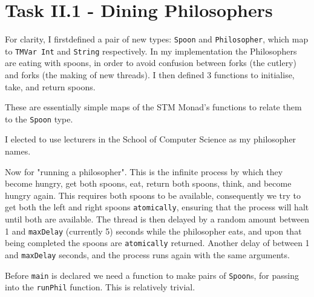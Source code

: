 \documentclass[12pt]{article}
\begin{document}
\maketitle
\tableofcontents

\section{Task II.1 - Dining Philosophers}



For clarity, I firstdefined a pair of new types: \verb|Spoon| and \verb|Philosopher|, which map to \verb|TMVar Int| and \verb|String| respectively.
In my implementation the Philosophers are eating with spoons, in order to avoid confusion between forks (the cutlery) and forks (the making of new threads).
I then defined 3 functions to initialise, take, and return spoons.



These are essentially simple maps of the STM Monad's functions to relate them to the \verb|Spoon| type.



I elected to use lecturers in the School of Computer Science as my philosopher names.



Now for "running a philosopher".
This is the infinite process by which they become hungry, get both spoons, eat, return both spoons, think, and become hungry again.
This requires both spoons to be available, consequently we try to get both the left and right spoons \verb|atomically|, ensuring that the process will halt until both are available.
The thread is then delayed by a random amount between 1 and \verb|maxDelay| (currently 5) seconds while the philosopher eats, and upon that being completed the spoons are \verb|atomically| returned.
Another delay of between 1 and \verb|maxDelay| seconds, and the process runs again with the same arguments.



Before \verb|main| is declared we need a function to make pairs of \verb|Spoon|s, for passing into the \verb|runPhil| function.
This is relatively trivial.


\end{document}
